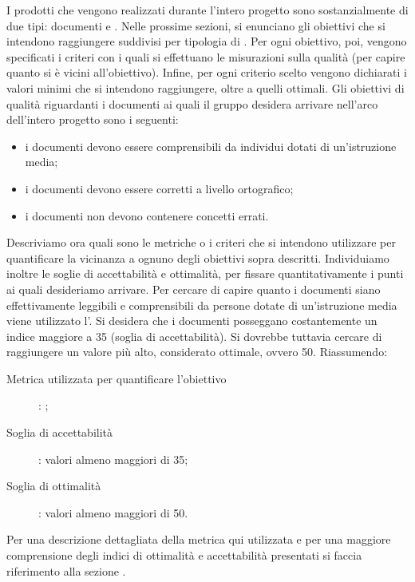 		  \label{subsec:obiettiviprodotto}
			I prodotti che vengono realizzati durante l'intero progetto sono sostanzialmente di due tipi: documenti e . Nelle prossime sezioni, si enunciano gli obiettivi che si intendono raggiungere suddivisi per tipologia di . Per ogni obiettivo, poi, vengono specificati i criteri con i quali si effettuano le misurazioni sulla qualità (per capire quanto si è vicini all'obiettivo). Infine, per ogni criterio scelto vengono dichiarati i valori minimi che si intendono raggiungere, oltre a quelli ottimali.
				Gli obiettivi di qualità riguardanti i documenti ai quali il gruppo \groupname{} desidera arrivare nell'arco dell'intero progetto sono i seguenti:
				\begin{itemize}
					\item i documenti devono essere comprensibili da individui dotati di un'istruzione media;
					\item i documenti devono essere corretti a livello ortografico;
					\item i documenti non devono contenere concetti errati.
				\end{itemize}
				Descriviamo ora quali sono le metriche o i criteri che si intendono utilizzare per quantificare la vicinanza a ognuno degli obiettivi sopra descritti. Individuiamo inoltre le soglie di accettabilità e ottimalità, per fissare quantitativamente i punti ai quali desideriamo arrivare.
					Per cercare di capire quanto i documenti siano effettivamente leggibili e comprensibili da persone dotate di un'istruzione media viene utilizzato l'. Si desidera che i documenti posseggano costantemente un indice maggiore a 35 (soglia di accettabilità). Si dovrebbe tuttavia cercare di raggiungere un valore più alto, considerato ottimale, ovvero 50. Riassumendo:
					\begin{description}
						\item[Metrica utilizzata per quantificare l'obiettivo]: ;
						\item[Soglia di accettabilità]: valori almeno maggiori di 35;
						\item[Soglia di ottimalità]: valori almeno maggiori di 50.
					\end{description}
					Per una descrizione dettagliata della metrica qui utilizzata e per una maggiore comprensione degli indici di ottimalità e accettabilità presentati si faccia riferimento alla sezione .
